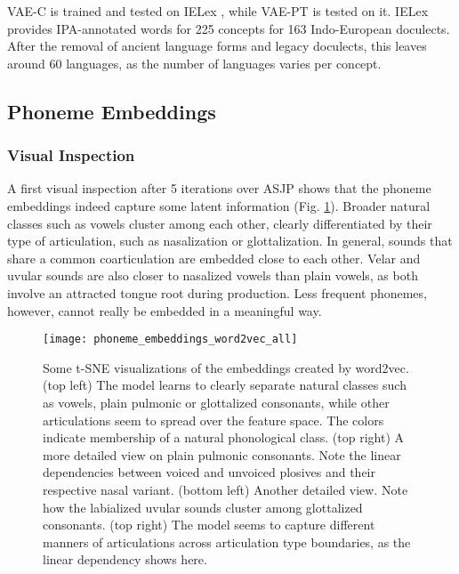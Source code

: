 \documentclass[6pt]{article}
\begin{document}
VAE-C is trained and tested on IELex \citep{dunn2012indo}, while VAE-PT is tested on it. IELex provides IPA-annotated words for 225 concepts for 163 Indo-European doculects. After the removal of ancient language forms and legacy doculects, this leaves around 60 languages, as the number of languages varies per concept.
\subsection{Phoneme Embeddings}
\subsubsection{Visual Inspection}
A first visual inspection after 5 iterations over ASJP shows that the phoneme embeddings indeed capture some latent information (Fig.  \ref{fig:phoneme_embeddings_word2vec_all}). Broader natural classes such as vowels cluster among each other,  clearly differentiated by their type of articulation, such as nasalization or glottalization. In general, sounds that share a common coarticulation are embedded close to each other. Velar and uvular sounds are also closer to nasalized vowels than plain vowels, as both involve an attracted tongue root during production. Less frequent phonemes, however, cannot really be embedded in a meaningful way.

\begin{figure}[h!] %
   \centering
   \texttt{[image: phoneme\_embeddings\_word2vec\_all]} 
   \caption{Some t-SNE visualizations of the embeddings created by word2vec. (top left) The model learns to clearly separate natural classes such as vowels, plain pulmonic or glottalized consonants, while other articulations seem to spread over the feature space. The colors indicate membership of a natural phonological class.  (top right) A more detailed view on plain pulmonic consonants. Note the linear dependencies between voiced and unvoiced plosives and their respective nasal variant. (bottom left) Another detailed view. Note how the labialized uvular sounds cluster among glottalized consonants. (top right) The model seems to capture different manners of articulations across articulation type boundaries, as the linear dependency shows here.}
   \label{fig:phoneme_embeddings_word2vec_all}
\end{figure}
\end{document}
